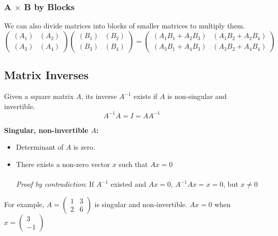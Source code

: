 \documentclass[12pt]{article}
\begin{document}
\subsubsection{A $\times$ B by Blocks}
We can also divide matrices into blocks of smaller matrices to multiply them.
\[
\left(
    \begin{matrix}
        (A_1) & (A_2)\\
        (A_3) & (A_4)
    \end{matrix}
\right)
\left(
    \begin{matrix}
        (B_1) & (B_2)\\
        (B_3) & (B_4)
    \end{matrix}
\right)
=
\left(
    \begin{matrix}
        (A_1B_1+A_2B_3) & (A_1B_2+A_2B_4)\\
        (A_3B_1+A_4B_3) & (A_3B_2+A_4B_4)
    \end{matrix}
\right)
\]

\subsection{Matrix Inverses}
Given a square matrix $A$, its inverse $A^{-1}$ exists if $A$ is non-singular and invertible.
\[A^{-1}A = I = AA^{-1}\]

\textbf{Singular, non-invertible $A$:}
\begin{itemize}
    \item Determinant of $A$ is zero.
    \item There exists a non-zero vector $x$ such that $Ax=0$\\
    \\
    \textit{Proof by contradiction}: If $A^{-1}$ existed and $Ax=0$, $A^{-1}Ax=x=0$, but $x\neq0$
\end{itemize}
For example, 
$A=\left(
    \begin{matrix}
        1 & 3\\
        2 & 6
    \end{matrix}
\right)$
is singular and non-invertible.
$Ax=0$ when
$x=\left(
    \begin{matrix}
        3\\
        -1
    \end{matrix}
\right)$
\end{document}
